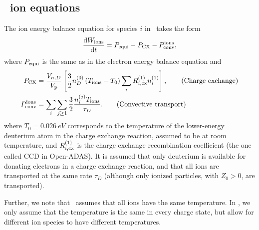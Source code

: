 \documentclass{notes}
\newcommand{\tDYON}{{\mdseries\DYON}}
\newcommand{\Vp}{V_{\rm p}}
\begin{document}
    \subsection{\tDYON\ ion equations}
    The ion energy balance equation for species $i$ in \DYON\ takes the form
    \begin{equation}
        \frac{\mathrm{d} W_{\rm ions}}{\mathrm{d} t} = P_{\rm equi} - P_{\rm CX} - P_{\rm conv}^{\rm ions},
    \end{equation}
    where $P_{\rm equi}$ is the same as in the electron energy balance equation
    and
    \begin{align}
        P_{\rm CX} &= \frac{V_{n,D}}{\Vp}\left[
            \frac{3}{2}n_D^{(0)}\left(T_{\rm ions}-T_0\right)\sum_i R_{i,{\rm cx}}^{(1)}n_i^{(1)}
        \right], \tag{Charge exchange}\\
        P_{\rm conv}^{\rm ions} &= \sum_i\sum_{j\geq 1}\frac{3}{2}\frac{n_i^{(j)}T_{\rm ions}}{\tau_D}.
        \tag{Convective transport}
    \end{align}
    where $T_0 = \SI{0.026}{eV}$ corresponds to the temperature of the
    lower-energy deuterium atom in the charge exchange reaction, assumed to be
    at room temperature, and $R_{i,{\rm cx}}^{(1)}$ is the charge exchange
    recombination coefficient (the one called CCD in Open-ADAS). It is assumed
    that only deuterium is available for donating electrons in a charge exchange
    reaction, and that all ions are transported at the same rate $\tau_D$
    (although only ionized particles, with $Z_0>0$, are transported).

    Further, we note that \DYON\ assumes that all ions have the same
    temperature. In \DREAM, we only assume that the temperature is the same in
    every charge state, but allow for different ion species to have different
    temperatures.
\end{document}
